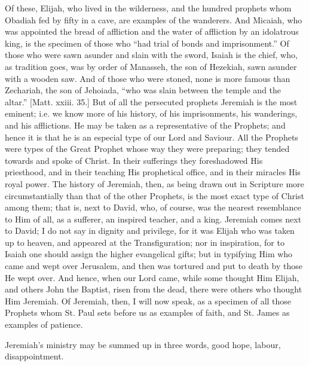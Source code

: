 Of these, Elijah, who lived in the wilderness, and the hundred
prophets whom Obadiah fed by fifty in a cave, are examples of the
wanderers. And Micaiah, who was appointed the bread of affliction and
the water of affliction by an idolatrous king, is the specimen of
those who ``had trial of bonds and imprisonment.'' Of those
who were sawn asunder and slain with the sword, Isaiah is the chief,
who, as tradition goes, was by order of Manasseh, the son of Hezekiah,
sawn asunder with a wooden saw. And of those who were stoned, none is
more famous than Zechariah, the son of Jehoiada, ``who was slain
between the temple and the altar.'' [Matt. xxiii. 35.] But of
all
the persecuted prophets Jeremiah is the most eminent; i.e. we know
more of his history, of his imprisonments, his wanderings, and his
afflictions. He may be taken as a representative of the Prophets; and
hence it is that he is an especial type of our Lord and Saviour. All
the Prophets were types of the Great Prophet whose way they were
preparing; they tended towards and spoke of Christ. In their
sufferings they foreshadowed His priesthood, and in their teaching His
prophetical office, and in their miracles His royal power. The history
of Jeremiah, then, as being drawn out in Scripture more
circumstantially than that of the other Prophets, is the most exact
type of Christ among them; that is, next to David, who, of course, was
the nearest resemblance to Him of all, as a sufferer, an inspired
teacher, and a king. Jeremiah comes next to David; I do not say in
dignity and privilege, for it was Elijah who was taken up to heaven,
and appeared at the Transfiguration; nor in inspiration, for to Isaiah
one should assign the higher evangelical gifts; but in typifying Him
who came and wept over Jerusalem, and then was tortured and put to
death by those He wept over. And hence, when our Lord came, while some
thought Him Elijah, and others John the Baptist, risen from the dead,
there were others who thought Him Jeremiah. Of Jeremiah, then, I will
now speak, as a specimen of all those Prophets whom St. Paul sets
before us as examples of faith, and St. James as examples of patience.

Jeremiah's ministry may be summed up in three words, good hope,
labour, disappointment.

